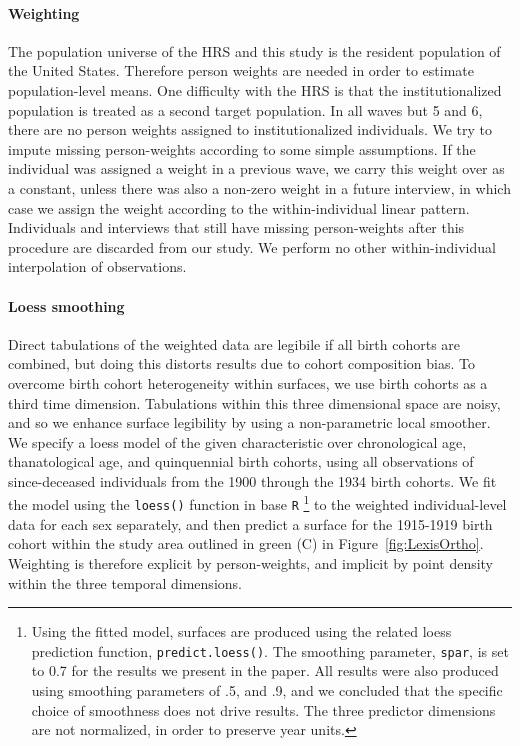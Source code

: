 \documentclass{article}
\begin{document}
\paragraph*{Weighting}
The population universe of the HRS and this study is the resident
population of the United States. Therefore person weights are needed in
order to estimate population-level means. 
One difficulty with the HRS is that the institutionalized population is treated
as a second target population. In all waves but 5 and 6, there are no person weights
assigned to institutionalized individuals. We try to impute missing
person-weights according to some simple assumptions. If the individual was
assigned a weight in a previous wave, we carry this weight over as a constant, unless there was also a non-zero weight in a future interview, in
which case we assign the weight according to the within-individual linear
pattern. Individuals and interviews that still have missing person-weights
after this procedure are discarded from our study. We perform no other
within-individual interpolation of observations.

\paragraph*{Loess smoothing}
Direct tabulations of the weighted data are legibile if all birth
cohorts are combined, but doing this distorts results due to cohort
composition bias. To overcome birth cohort heterogeneity within surfaces,
we use birth cohorts as a third time dimension. Tabulations within this three dimensional space are noisy, and so we
enhance surface legibility by using a non-parametric local smoother.
We specify a loess model of the given characteristic over chronological age,
thanatological age, and quinquennial birth cohorts, using all observations of since-deceased individuals from the 1900 through the 1934 birth cohorts. We fit the model using the \texttt{loess()} function in base \texttt{R} \citep{cleveland1992local,Rcore2013}\footnote{Using the fitted model, surfaces are produced using the related loess prediction function, \texttt{predict.loess()}. The smoothing parameter, \texttt{spar}, is set to 0.7 for the results we present in the paper.
All results were also produced using smoothing parameters of .5, and .9, and
we concluded that the specific choice of smoothness does not drive results.
The three predictor dimensions are not normalized, in order to preserve year
units. } to the weighted individual-level data for each sex separately, and then
predict a surface for the 1915-1919 birth cohort within the study area outlined
in green (C) in Figure~\ref{fig:LexisOrtho}. Weighting is therefore explicit by
person-weights, and implicit by point density within the three temporal
dimensions.
\end{document}
